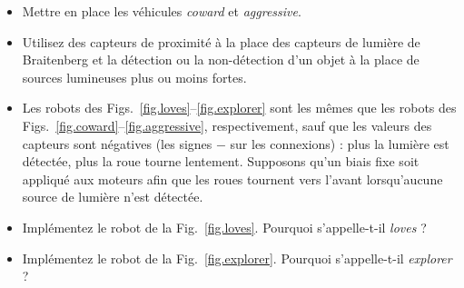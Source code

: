 {\begin{framed}
\begin{itemize}
\item Mettre en place les véhicules \emph{coward} et \emph{aggressive}.
\item Utilisez des capteurs de proximité à la place des capteurs de lumière de Braitenberg et la détection ou la non-détection d'un objet à la place de sources lumineuses plus ou moins fortes.
\item Les robots des Figs.~\ref{fig.loves}--\ref{fig.explorer} sont les mêmes que les robots des Figs.~\ref{fig.coward}--\ref{fig.aggressive}, respectivement, sauf que les valeurs des capteurs sont négatives (les signes $-$ sur les connexions) : plus la lumière est détectée, plus la roue tourne lentement. Supposons qu'un biais fixe soit appliqué aux moteurs afin que les roues tournent vers l'avant lorsqu'aucune source de lumière n'est détectée.
\item Implémentez le robot de la Fig.~\ref{fig.loves}. Pourquoi s'appelle-t-il \emph{loves} ?
\item Implémentez le robot de la Fig.~\ref{fig.explorer}. Pourquoi s'appelle-t-il \emph{explorer} ?
\end{itemize}
\end{framed}


}

